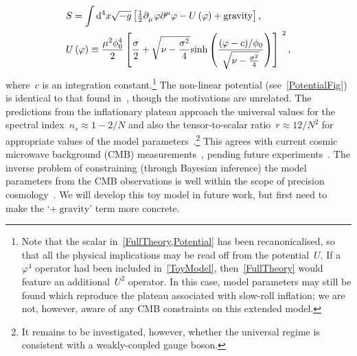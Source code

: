\documentclass[aps,prd,reprint,preprintnumbers,showpacs,floatfix,nofootinbib,superscript address]{revtex4-2}
\begin{document}
\begin{subequations}
\begin{align}
	&S=\int\mathrm{d}^4x\sqrt{-g}\left[\tfrac{1}{2}\PD{_\mu}\varphi\PD{^\mu}\varphi-U\left(\varphi\right)+\text{gravity}\right],\label{FullTheory}\\
	&U\left(\varphi\right)\equiv\frac{\mu^2\phi_0^4}{2}\left[\frac{\sigma}{2}+\sqrt{\nu-\frac{\sigma^2}{4}}\text{sinh}\left(\frac{(\varphi-c)/\phi_0}{\sqrt{\nu-\frac{\sigma^2}{4}}}\right)\right]^{\ 2},\label{Potential}
\end{align}
\end{subequations}
where~$c$ is an integration constant.\footnote{Note that the scalar in~\cref{FullTheory,Potential} has been recanonicalised, so that all the physical implications may be read off from the potential~$U$. If a~$\varphi^4$ operator had been included in~\cref{ToyModel}, then~\cref{FullTheory} would feature an additional~$U^2$ operator. In this case, model parameters may still be found which reproduce the plateau associated with slow-roll inflation; we are not, however, aware of any CMB constraints on this extended model.} The non-linear potential (see~\cref{PotentialFig}) is identical to that found in~\cite{Barker:2024dhb,Salvio:2022suk}, though the motivations are unrelated. The predictions from the inflationary plateau approach the universal values for the spectral index~$n_s\approx 1-2/N$ and also the tensor-to-scalar ratio~$r\approx12/N^2$ for appropriate values of the model parameters~\cite{Salvio:2022suk,Karananas:2025xcv}.\footnote{It remains to be investigated, however, whether the universal regime is consistent with a weakly-coupled gauge boson.} This agrees with current cosmic microwave background (CMB) measurements~\cite{Planck:2018jri,BICEP:2021xfz}, pending future experiments~\cite{arXiv:1110.3193,Weltman:2018zrl,Abazajian:2019eic,LiteBIRD:2022cnt}. The inverse problem of constraining (through Bayesian inference) the model parameters from the CMB observations is well within the scope of precision cosmology~\cite{Handley:2019fll}. We will develop this toy model in future work, but first need to make the `$+\ \text{gravity}$' term more concrete.
\end{document}
